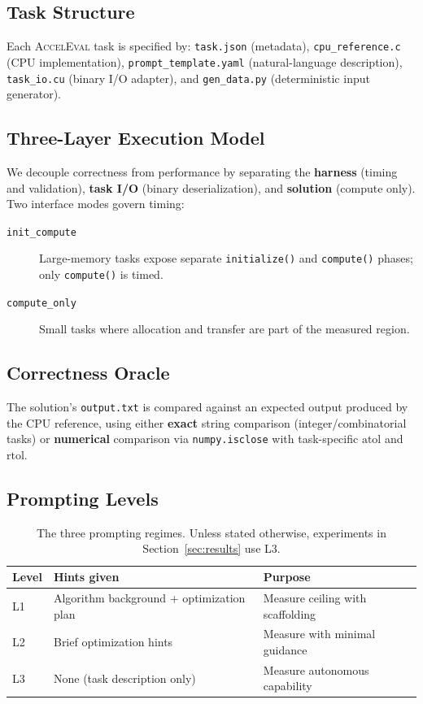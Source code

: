 \documentclass{article}
\begin{document}
\subsection{Task Structure}
Each \textsc{AccelEval} task is specified by: \texttt{task.json} (metadata), \texttt{cpu\_reference.c} (CPU implementation), \texttt{prompt\_template.yaml} (natural-language description), \texttt{task\_io.cu} (binary I/O adapter), and \texttt{gen\_data.py} (deterministic input generator).

\subsection{Three-Layer Execution Model}
We decouple correctness from performance by separating the \textbf{harness} (timing and validation), \textbf{task I/O} (binary deserialization), and \textbf{solution} (compute only). Two interface modes govern timing:
\begin{description}
  \item[\texttt{init\_compute}] Large-memory tasks expose separate \texttt{initialize()} and \texttt{compute()} phases; only \texttt{compute()} is timed.
  \item[\texttt{compute\_only}] Small tasks where allocation and transfer are part of the measured region.
\end{description}

\subsection{Correctness Oracle}
The solution's \texttt{output.txt} is compared against an expected output produced by the CPU reference, using either \textbf{exact} string comparison (integer/combinatorial tasks) or \textbf{numerical} comparison via \texttt{numpy.isclose} with task-specific $\mathrm{atol}$ and $\mathrm{rtol}$.

\subsection{Prompting Levels}

\begin{table}[ht]
\centering
\small
\caption{The three prompting regimes. Unless stated otherwise, experiments in Section~\ref{sec:results} use L3.}
\label{tab:levels}
\begin{tabular}{@{}lll@{}}
\toprule
\textbf{Level} & \textbf{Hints given} & \textbf{Purpose} \\
\midrule
L1 & Algorithm background + optimization plan & Measure ceiling with scaffolding \\
L2 & Brief optimization hints & Measure with minimal guidance \\
L3 & None (task description only) & Measure autonomous capability \\
\bottomrule
\end{tabular}
\end{table}
\end{document}
